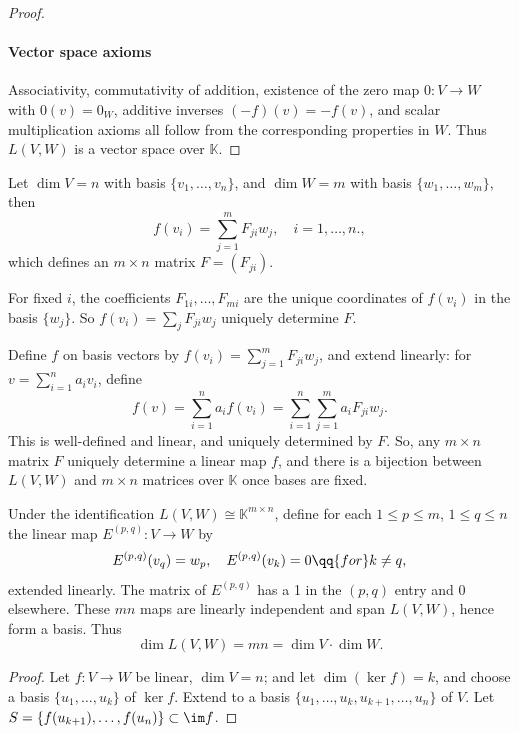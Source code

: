 \begin{solution}
\begin{enumext}
\begin{proof}
    \paragraph{Vector space axioms}
    Associativity, commutativity of addition, existence of the zero map $0: V \to W$ with $0(v) = 0_W$, additive inverses $(-f)(v) = -f(v)$, and scalar multiplication axioms all follow from the corresponding properties in $W$.
    Thus $L(V, W)$ is a vector space over $\mathbb{K}$.
    \end{proof}
    \item Let $\dim V = n$ with basis $\{v_1, \dots, v_n\}$, and $\dim W = m$ with basis $\{w_1, \dots, w_m\}$, then
    \[
    f(v_i) = \sum_{j=1}^m F_{ji}  w_j, \quad i = 1, \dots, n.,
    \]
    which defines an $m \times n$ matrix $F = (F_{ji})$.
    \begin{enumext}
      \item For fixed $i$, the coefficients $F_{1i}, \dots, F_{mi}$ are the unique coordinates of $f(v_i)$ in the basis $\{w_j\}$. So $f(v_i) = \sum_j F_{ji} w_j$ uniquely determine $F$.
      \item Define $f$ on basis vectors by $f(v_i) = \sum_{j=1}^m F_{ji} w_j$, and extend linearly: for $v = \sum_{i=1}^n a_i v_i$, define
      \[
      f(v) = \sum_{i=1}^n a_i f(v_i) = \sum_{i=1}^n \sum_{j=1}^m a_i F_{ji} w_j.
      \]
      This is well-defined and linear, and uniquely determined by $F$.
      So, any $m \times n$ matrix $F$ uniquely determine a linear map $f$,
      and there is a bijection between $L(V,W)$ and $m \times n$ matrices over $\mathbb{K}$ once bases are fixed.
    \end{enumext}
    \item Under the identification $L(V,W) \cong \mathbb{K}^{m \times n}$, define for each $1 \le p \le m$, $1 \le q \le n$ the linear map $E^{(p,q)} : V \to W$ by
    \[
      E^{(p,q)}(v_q) = w_p, \quad E^{(p,q)}(v_k) = 0 \qq{for} k \ne q,
    \]
    extended linearly.
    The matrix of $E^{(p,q)}$ has a 1 in the $(p,q)$ entry and 0 elsewhere.  
    These $mn$ maps are linearly independent and span $L(V, W)$, hence form a basis.  
    Thus
    \[
      \dim L(V,W) = m n = \dim V \cdot \dim W.
    \]
    \item \begin{proof}
    Let $f : V \to W$ be linear, $\dim V = n$; and
    let $\dim(\ker f) = k$, and choose a basis $\{u_1, \dots, u_k\}$ of $\ker f$.  
    Extend to a basis $\{u_1, \dots, u_k, u_{k+1}, \dots, u_n\}$ of $V$.
    Let $S = \{f(u_{k+1}), \dots, f(u_n)\} \subset \im f$.

\end{proof}
\end{enumext}
\end{solution}
